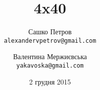 \documentclass[a4paper,12pt]{book}
\begin{document}
\author{
    Сашко Петров\\
    \texttt{alexandervpetrov@gmail.com}
    \and
    Валентина Мержиєвська\\
    \texttt{yakavoska@gmail.com}
}
\title{4x40}
\date{2 грудня 2015}

\frontmatter
\maketitle
\tableofcontents
\mainmatter





\backmatter
\end{document}
